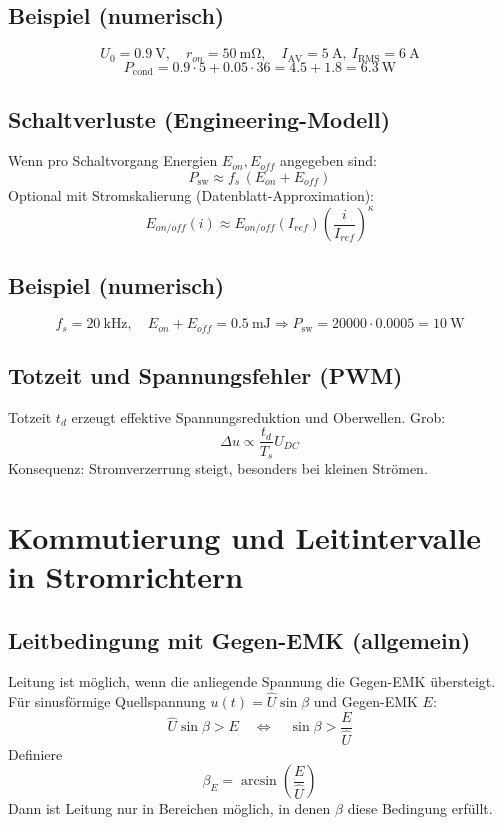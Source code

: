 \documentclass[a4paper,11pt]{article}
\begin{document}
\subsection*{Beispiel (numerisch)}
\[
U_0=\SI{0.9}{\volt},\quad r_{on}=\SI{50}{\milli\ohm},\quad
I_{\mathrm{AV}}=\SI{5}{\ampere},\ I_{\mathrm{RMS}}=\SI{6}{\ampere}
\]
\[
P_{\mathrm{cond}}=0.9\cdot 5 + 0.05\cdot 36 = 4.5+1.8=\SI{6.3}{\watt}
\]

\subsection{Schaltverluste (Engineering-Modell)}
Wenn pro Schaltvorgang Energien $E_{on}, E_{off}$ angegeben sind:
\[
P_{\mathrm{sw}} \approx f_s\,(E_{on}+E_{off})
\]
Optional mit Stromskalierung (Datenblatt-Approximation):
\[
E_{on/off}(i) \approx E_{on/off}(I_{ref})\left(\frac{i}{I_{ref}}\right)^\kappa
\]

\subsection*{Beispiel (numerisch)}
\[
f_s=\SI{20}{\kilo\hertz},\quad E_{on}+E_{off}=\SI{0.5}{\milli\joule}
\Rightarrow
P_{\mathrm{sw}}=20000\cdot 0.0005=\SI{10}{\watt}
\]

\subsection{Totzeit und Spannungsfehler (PWM)}
Totzeit $t_d$ erzeugt effektive Spannungsreduktion und Oberwellen. Grob:
\[
\Delta u \propto \frac{t_d}{T_s}U_{DC}
\]
Konsequenz: Stromverzerrung steigt, besonders bei kleinen Strömen.

\section{Kommutierung und Leitintervalle in Stromrichtern}

\subsection{Leitbedingung mit Gegen-EMK (allgemein)}
Leitung ist möglich, wenn die anliegende Spannung die Gegen-EMK übersteigt.
Für sinusförmige Quellspannung $u(t)=\hat{U}\sin\beta$ und Gegen-EMK $E$:
\[
\hat{U}\sin\beta > E \quad \Leftrightarrow \quad \sin\beta > \frac{E}{\hat{U}}
\]
Definiere
\[
\beta_E = \arcsin\!\left(\frac{E}{\hat{U}}\right)
\]
Dann ist Leitung nur in Bereichen möglich, in denen $\beta$ diese Bedingung erfüllt.
\end{document}
